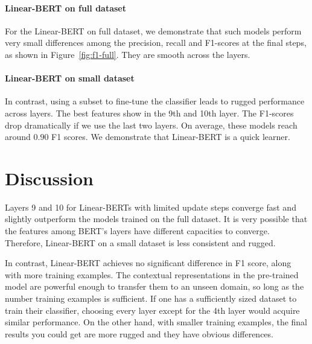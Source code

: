 \documentclass[11pt,a4paper]{article}
\begin{document}
\paragraph{Linear-BERT on full dataset}
For the Linear-BERT on full dataset, we demonstrate that such models perform very small differences among the precision, recall and F1-scores at the final steps, as shown in Figure~\ref{fig:f1-full}. They are smooth across the layers.


\paragraph{Linear-BERT on small dataset}
In contrast, using a subset to fine-tune the classifier leads to rugged performance across layers. The best features show in the 9th and 10th layer. The F1-scores drop dramatically if we use the last two layers. On average, these models reach around $0.90$ F1 scores.
We demonstrate that Linear-BERT is a quick learner.


\section{Discussion}
Layers 9 and 10 for Linear-BERTs with limited update steps converge fast and slightly outperform the models trained on the full dataset. It is very possible that the features among BERT's layers have different capacities to converge. Therefore, Linear-BERT on a small dataset is less consistent and rugged.

In contrast, Linear-BERT achieves no significant difference in F1 score, along with more training examples. The contextual representations in the pre-trained model are powerful enough to transfer them to an unseen domain, so long as the number training examples is sufficient. If one has a sufficiently sized dataset to train their classifier, choosing every layer except for the 4th layer would acquire similar performance. On the other hand, with smaller training examples, the final results you could get are more rugged and they have obvious differences.
\end{document}
